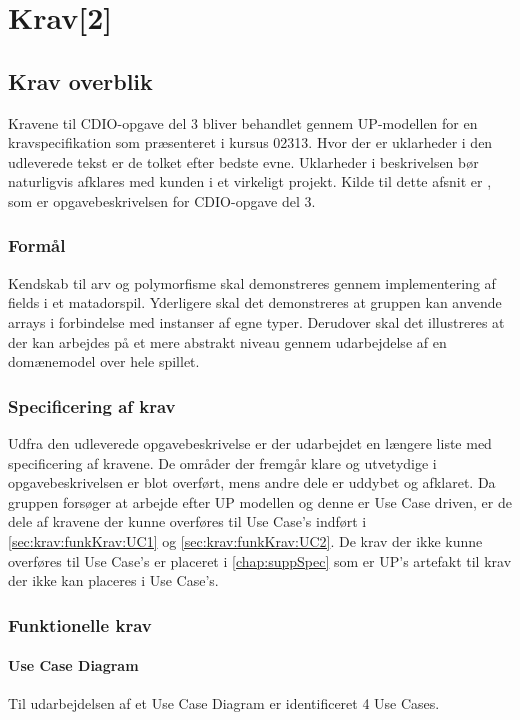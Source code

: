 \chapter{Krav[2]}\label{chap:krav}

\section{Krav overblik}\label{sec:krav:kravOverblik}
Kravene til CDIO-opgave del 3 bliver behandlet gennem UP-modellen for en kravspecifikation som præsenteret i kursus 02313. Hvor der er uklarheder i den udleverede tekst er de tolket efter bedste evne. Uklarheder i beskrivelsen bør naturligvis afklares med kunden i et virkeligt projekt. Kilde til dette afsnit er \cite{CDIOdel3}, som er opgavebeskrivelsen for CDIO-opgave del 3.

\subsection{Formål}\label{sec:krav:formål}
Kendskab til arv og polymorfisme skal demonstreres gennem implementering af fields i et matadorspil. Yderligere skal det demonstreres at gruppen kan anvende arrays i forbindelse med instanser af egne typer. Derudover skal det illustreres at der kan arbejdes på et mere abstrakt niveau gennem udarbejdelse af en domænemodel over hele spillet. 

\subsection{Specificering af krav}\label{sec:krav:kravSpec}
Udfra den udleverede opgavebeskrivelse \cite{CDIOdel3} er der udarbejdet en længere liste med specificering af kravene. De områder der fremgår klare og utvetydige i opgavebeskrivelsen er blot overført, mens andre dele er uddybet og afklaret. Da gruppen forsøger at arbejde efter UP modellen og denne er Use Case driven, er de dele af kravene der kunne overføres til Use Case's indført i \ref{sec:krav:funkKrav:UC1} og \ref{sec:krav:funkKrav:UC2}. De krav der ikke kunne overføres til Use Case's er placeret i \ref{chap:suppSpec} som er UP's artefakt til krav der ikke kan placeres i Use Case's.
 
\subsection{Funktionelle krav}\label{sec:krav:funkKrav}
\subsubsection{Use Case Diagram}\label{sec:krav:funkKrav:useCaseDia}
Til udarbejdelsen af et Use Case Diagram er identificeret 4 Use Cases. 

